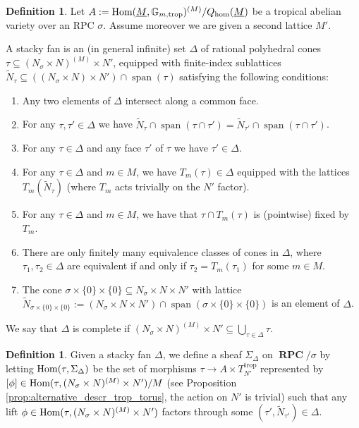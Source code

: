 \documentclass[11pt]{amsart}
\theoremstyle{definition}
\newtheorem{definition}[theorem]{Definition}
\theoremstyle{remark}
\DeclareMathOperator{\Span}{span}
\def\hom{\mathrm{hom}}
\def\trop{\mathrm{trop}}
\DeclareMathOperator{\RPC}{\mathbf{RPC}}
\DeclareMathOperator{\Hom}{\textup{Hom}}
\begin{document}
\begin{definition}
	\label{def:stacky_fan}
	Let $A:=\Hom(\underline{M},\mathbb{G}_{m,\trop})^{(M)}/Q_{\hom}(\underline{M})$ be a tropical abelian variety
	over an RPC $\sigma$. Assume moreover we are given a second lattice $M'$.

	A stacky fan is an (in general infinite) set $\Delta$ of rational polyhedral cones $\tau\subseteq (N_{\sigma}\times N)^{(M)}\times N'$,
	equipped with finite-index sublattices $\tilde{N}_{\tau}\subseteq ((N_{\sigma}\times N)\times N')\cap \Span(\tau)$
	satisfying the following conditions:
		\begin{enumerate}
			\item Any two elements of $\Delta$ intersect along a common face.
			\item For any $\tau,\tau'\in \Delta$ we have $\tilde{N}_{\tau}\cap \Span(\tau\cap \tau')=\tilde{N}_{\tau'}\cap \Span(\tau\cap \tau')$.
			\item For any $\tau\in \Delta$ and any face $\tau'$ of $\tau$ we have $\tau'\in \Delta$.
			\item For any $\tau\in \Delta$ and $m\in M$, we have $T_m(\tau)\in \Delta$ equipped with the lattices $T_m(\tilde{N}_{\tau})$ (where $T_m$ acts trivially on the $N'$ factor).
			\item For any $\tau\in \Delta$ and $m\in M$, we have that $\tau\cap T_m(\tau)$ is (pointwise) fixed by $T_m$.
			\item There are only finitely many equivalence classes of cones in $\Delta$, where $\tau_1,\tau_2\in \Delta$ are equivalent if and only if $\tau_2=T_m(\tau_1)$ for some $m\in M$.
			\item The cone $\sigma\times\{0\}\times\{0\}\subseteq N_{\sigma}\times N\times N'$ with lattice
				$\tilde{N}_{\sigma\times \{0\}\times\{0\}}:=(N_{\sigma}\times N\times N')\cap \Span(\sigma\times \{0\}\times\{0\})$ is an element of $\Delta$.
		\end{enumerate}
		We say that $\Delta$ is complete if $(N_{\sigma}\times N)^{(M)}\times N'\subseteq \bigcup_{\tau\in \Delta}^{}\tau$.
\end{definition}

\begin{definition}
	Given a stacky fan $\Delta$, we define a sheaf $\Sigma_{\Delta}$ on $\RPC/\sigma$ by letting $\Hom(\tau,\Sigma_{\Delta})$
	be the set of morphisms $\tau\to A\times T_{N'}^{\trop}$
	represented by $[\phi]\in \Hom(\tau,(N_{\sigma}\times N)^{(M)}\times N')/M$ (see Proposition \ref{prop:alternative_descr_trop_torus}, the action on $N'$ is trivial)
	such that any lift $\phi\in \Hom(\tau,(N_{\sigma}\times N)^{(M)}\times N')$ factors through some $(\tau',\tilde{N}_{\tau'})\in \Delta$.
\end{definition}
\end{document}
